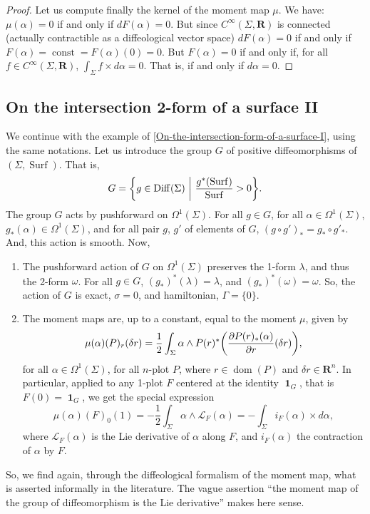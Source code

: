 \documentclass[10pt,reqno,twoside]{amsart}
\newcommand{\RR}{\mathbf{R}}
\DeclareMathOperator{\dom}{dom}
\DeclareMathOperator{\id}{\mathbf{1}}
\DeclareMathOperator{\Diff}{Diff}
\DeclareMathOperator{\Surf}{Surf}
\DeclareMathOperator{\const}{const}
\newcommand{\Cinfty}{C^\infty}
\newcommand{\undemi}{\frac{1}{2}}
\newcommand{\DLie}{\mathcal{L}} %
\theoremstyle{plain}
\theoremstyle{definition}
\newcommand{\article}[1]{\subsection{#1}}
\begin{document}
\begin{proof}
    Let us compute finally the kernel of the moment map $\mu$.
    We have:
    $\mu(\alpha) = 0$ if and only if $dF(\alpha) = 0$.
    But since $\Cinfty(\Sigma,\RR)$ is connected (actually contractible as a diffeological vector space) $dF(\alpha) = 0$ if and only if $F(\alpha) = \const = F(\alpha)(0) = 0$.
    But $F(\alpha) = 0$ if and only if,
    for all $f \in \Cinfty(\Sigma,\RR)$,
    $\int_\Sigma f \times d\alpha = 0$.
    That is,
    if and only if $d\alpha = 0$.
  \end{proof}
  
  \article{On the intersection 2-form of a surface II}
  \label{On-the-intersection-form-of-a-surface-II}
  We continue with the example of \ref{On-the-intersection-form-of-a-surface-I},
  using the same notations.
  Let us introduce the group $G$ of positive diffeomorphisms of $(\Sigma,\Surf)$.
  That is,
  $$
    G = \bigg\{ g \in \Diff(\Sigma) \ \bigg| \ {g^*(\Surf) \over \Surf} >0 \bigg\}.
    $$
  The group $G$ acts by pushforward on $\Omega^1(\Sigma)$.
  For all $g \in G$,
  for all $\alpha \in \Omega^1(\Sigma)$,
  $g_*(\alpha) \in \Omega^1(\Sigma)$,
  and for all pair $g$, $g'$ of elements of $G$,
  $(g \circ g')_* = g_* \circ g'_*$.
  And,
  this action is smooth.
  Now,
  
  \begin{enumerate}
    \item The pushforward action of $G$ on $\Omega^1(\Sigma)$ preserves the 1-form $\lambda$, and thus the 2-form $\omega$. For all $g \in G$, $(g_*)^*(\lambda) = \lambda$, and $(g_*)^*(\omega) = \omega$. So, the action of $G$ is exact, $\sigma = 0$, and hamiltonian, $\Gamma = \{0\}$.
    \item The moment maps are, up to a constant, equal to the moment $\mu$, given by
    $$
      \mu(\alpha)(P)_r(\delta r) = \undemi \int_\Sigma \alpha \wedge P (r)^*\bigg({\partial P (r)_*(\alpha) \over \partial r}(\delta r)\bigg),
      $$
    for all $\alpha \in \Omega^1(\Sigma)$, for all $n$-plot $P$, where $r \in \dom(P)$ and $\delta r \in \RR^n$. In particular, applied to any 1-plot $F$ centered at the identity $\id_G$, that is $F(0) = \id_G$, we get the special expression
    $$
      \mu(\alpha)(F)_0(1) = - \undemi \int_\Sigma \alpha \wedge \DLie_F(\alpha) = - \int_\Sigma i_F(\alpha) \times d\alpha,
      $$
    where $\DLie_F(\alpha)$ is the Lie derivative of $\alpha$ along $F$, and $i_F(\alpha)$ the contraction of $\alpha$ by $F$.
  \end{enumerate}
  So,
  we find again,
  through the diffeological formalism of the moment map,
  what is asserted informally in the literature.
  The vague assertion ``the moment map of the group of diffeomorphism is the Lie derivative'' makes here sense.
  
\end{document}
